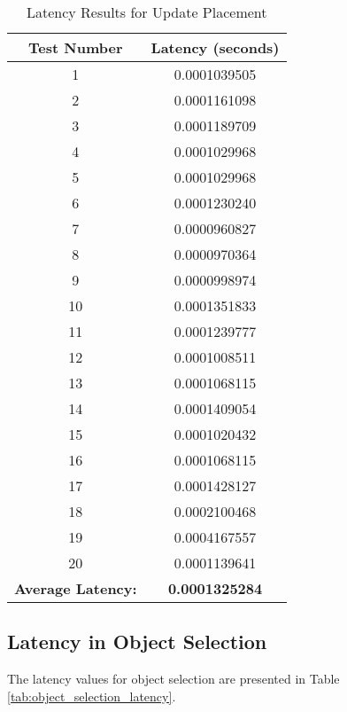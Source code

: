 \begin{table}[h!]
    \centering
    \caption{Latency Results for Update Placement}
    \label{tab:update_placement_latency}
    \begin{tabular}{|c|c|}
        \hline
        \textbf{Test Number} & \textbf{Latency (seconds)} \\
        \hline
        1 & 0.0001039505 \\
        2 & 0.0001161098 \\
        3 & 0.0001189709 \\
        4 & 0.0001029968 \\
        5 & 0.0001029968 \\
        6 & 0.0001230240 \\
        7 & 0.0000960827 \\
        8 & 0.0000970364 \\
        9 & 0.0000998974 \\
        10 & 0.0001351833 \\
        11 & 0.0001239777 \\
        12 & 0.0001008511 \\
        13 & 0.0001068115 \\
        14 & 0.0001409054 \\
        15 & 0.0001020432 \\
        16 & 0.0001068115 \\
        17 & 0.0001428127 \\
        18 & 0.0002100468 \\
        19 & 0.0004167557 \\
        20 & 0.0001139641 \\
        \hline
        \multicolumn{1}{|r|}{\textbf{Average Latency:}} & \textbf{0.0001325284} \\
        \hline
    \end{tabular}
\end{table}

\subsection{Latency in Object Selection}
The latency values for object selection are presented in Table \ref{tab:object_selection_latency}.

